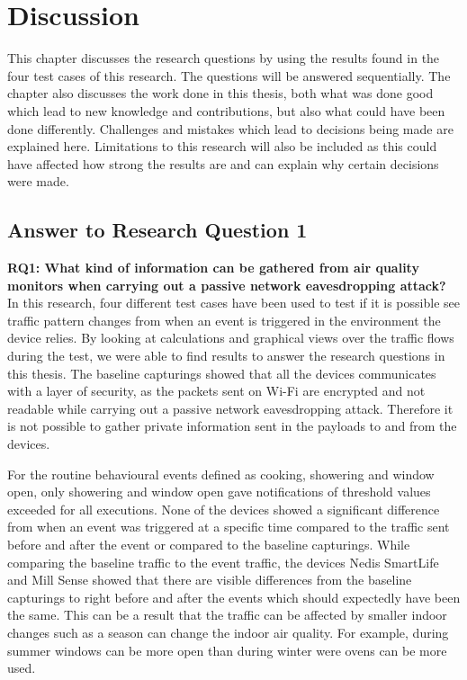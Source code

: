 \chapter{Discussion}
This chapter discusses the research questions by using the results found in the four test cases of this research. The questions will be answered sequentially. The chapter also discusses the work done in this thesis, both what was done good which lead to new knowledge and contributions, but also what could have been done differently. Challenges and mistakes which lead to decisions being made are explained here. Limitations to this research will also be included as this could have affected how strong the results are and can explain why certain decisions were made. 

\section{Answer to Research Question 1}
\textbf{\gls{RQ}1: What kind of information can be gathered from air quality monitors when carrying out a passive network eavesdropping attack?}\\

In this research, four different test cases have been used to test if it is possible see traffic pattern changes from when an event is triggered in the environment the device relies. By looking at calculations and graphical views over the traffic flows during the test, we were able to find results to answer the research questions in this thesis. The baseline capturings showed that all the devices communicates with a layer of security, as the packets sent on \gls{Wi-Fi} are encrypted and not readable while carrying out a passive network eavesdropping attack. Therefore it is not possible to gather private information sent in the payloads to and from the devices. 

For the routine behavioural events defined as cooking, showering and window open, only showering and window open gave notifications of threshold values exceeded for all executions. None of the devices showed a significant difference from when an event was triggered at a specific time compared to the traffic sent before and after the event or compared to the baseline capturings. While comparing the baseline traffic to the event traffic, the devices Nedis SmartLife and Mill Sense showed that there are visible differences from the baseline capturings to right before and after the events which should expectedly have been the same. This can be a result that the traffic can be affected by smaller indoor changes such as a season can change the indoor air quality. For example, during summer windows can be more open than during winter were ovens can be more used. 

